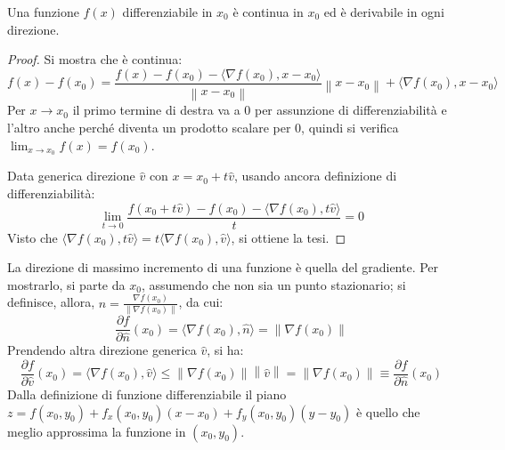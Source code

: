 \documentclass[11pt, a4paper]{scrartcl}
\theoremstyle{definition}
\numberwithin{esempio}{section}
\theoremstyle{definition}
\numberwithin{obs}{section}
\numberwithin{nota}{section}
\numberwithin{equation}{subsection}
\begin{document}
\begin{teorema}
	{}{}
	Una funzione $f(x)$ differenziabile in $x_0$ \`e continua in $x_0$ ed \`e derivabile in ogni direzione.
	\begin{proof}
		Si mostra che \`e continua:
		\[
		f(x) - f(x_0)  = \frac{f(x) - f(x_0) - \langle \nabla f(x_0) , x-x_0 \rangle}{\left\lVert x-x_0 \right\rVert } \left\lVert x-x_0 \right\rVert + \langle \nabla f(x_0) , x-x_0 \rangle
		\] 
		Per $x\to x_0$ il primo termine di destra va a $0$ per assunzione di differenziabilit\`a e l'altro anche perch\'e diventa un prodotto scalare per $0$, quindi si verifica $\lim_{x \to x_0} f(x) = f(x_0)$.

		Data generica direzione $\hat{v}$ con $x = x_0 + t \hat{v}$, usando ancora definizione di differenziabilit\`a:
		\[
		\lim_{t \to 0} \frac{f(x_0 + t \hat{v})- f(x_0) - \langle \nabla f(x_0), t \hat{v} \rangle}{t} = 0 
		\] 
Visto che $\langle \nabla f(x_0 ) , t \hat{v} \rangle = t \langle \nabla f(x_0) ,\hat{v} \rangle$, si ottiene la tesi.
	\end{proof}
\end{teorema}
\noindent La direzione di massimo incremento di una funzione \`e quella del gradiente. Per mostrarlo, si parte da $x_0$, assumendo che non sia un punto stazionario; si definisce, allora, $\hat{n} = \frac{\nabla f(x_0)}{\left\lVert \nabla f(x_0) \right\rVert} $, da cui:
\[
\frac{\partial f}{\partial \hat{n}} (x_0) = \langle \nabla f(x_0), \hat{n} \rangle = \left\lVert \nabla f(x_0) \right\rVert 
\] 
Prendendo altra direzione generica $\hat{v}$, si ha:
\[
\frac{\partial f}{\partial \hat{v}} (x_0) = \langle \nabla f(x_0) , \hat{v}  \rangle \le  \left\lVert \nabla f(x_0) \right\rVert \left\lVert \hat{v} \right\rVert = \left\lVert \nabla f(x_0) \right\rVert \equiv \frac{\partial f}{\partial \hat{n}} (x_0)
\] 
Dalla definizione di funzione differenziabile il piano $z = f(x_0,y_0) +f_x(x_0,y_0) (x-x_0) + f_y(x_0,y_0) (y-y_0)$ \`e quello che meglio approssima la funzione in $(x_0,y_0)$.
\end{document}
